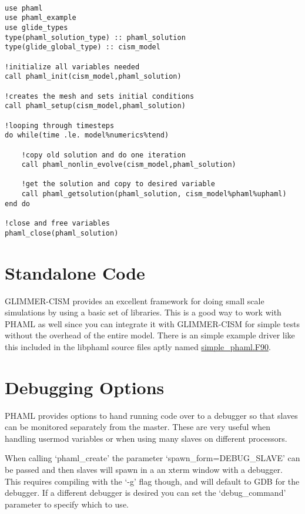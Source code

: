 \begin{framecode}{6in}
\begin{verbatim}

use phaml
use phaml_example
use glide_types
type(phaml_solution_type) :: phaml_solution
type(glide_global_type) :: cism_model

!initialize all variables needed
call phaml_init(cism_model,phaml_solution)

!creates the mesh and sets initial conditions 
call phaml_setup(cism_model,phaml_solution)

!looping through timesteps
do while(time .le. model%numerics%tend)

    !copy old solution and do one iteration
    call phaml_nonlin_evolve(cism_model,phaml_solution)
    
    !get the solution and copy to desired variable
    call phaml_getsolution(phaml_solution, cism_model%phaml%uphaml)
end do

!close and free variables
phaml_close(phaml_solution)

\end{verbatim}
\end{framecode}
\section{Standalone Code}

GLIMMER-CISM provides an excellent framework for doing small scale simulations by using a basic set of libraries.  This is a good way to work with PHAML as well since you can integrate it with GLIMMER-CISM for simple tests without the overhead of the entire model.  There is an simple example driver like this included in the libphaml source files aptly named \href{http://svn.berlios.de/svnroot/repos/glimmer-cism/glimmer-cism2/libphaml/simple\_phaml.F90}{simple\_phaml.F90}. 

\section{Debugging Options}

PHAML provides options to hand running code over to a debugger so that slaves can be monitored separately from the master.  These are very useful when handling usermod variables or when using many slaves on different processors.  

When calling `phaml\_create' the parameter `spawn\_form=DEBUG\_SLAVE' can be passed and then slaves will spawn in a an xterm window with a debugger.  This requires compiling with the `-g' flag though, and will default to GDB for the debugger.  If a different debugger is desired you can set the `debug\_command' parameter to specify which to use.
